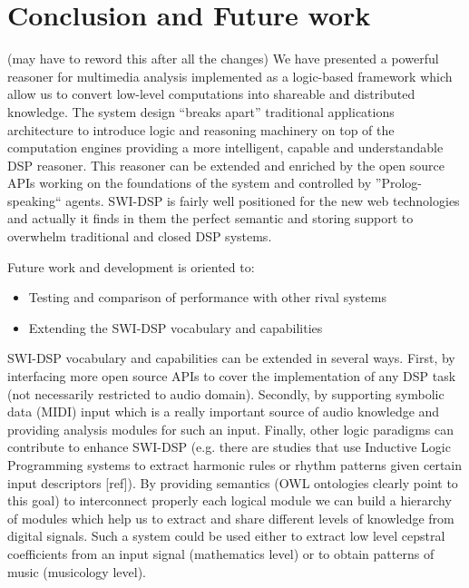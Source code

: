 \documentclass[runningheads]{llncs}
\begin{document}

\section{Conclusion and Future work}\label{sec:conclusion}

(may have to reword this after all the changes)
We have presented a powerful reasoner for multimedia analysis implemented as a logic-based framework which allow us to convert low-level computations into shareable and distributed knowledge. The system design ``breaks apart'' traditional applications architecture to introduce logic and reasoning machinery on top of the computation engines providing a more intelligent, capable and understandable DSP reasoner. This reasoner can be extended and enriched by the open source APIs working on the foundations of the system and controlled by ''Prolog-speaking`` agents. SWI-DSP is fairly well positioned for the new web technologies and actually it finds in them the perfect semantic and storing support to overwhelm traditional and closed DSP systems.

Future work and development is oriented to:

\begin{itemize}
 \item Testing and comparison of performance with other rival systems
 \item Extending the SWI-DSP vocabulary and capabilities
\end{itemize}

SWI-DSP vocabulary and capabilities can be extended in several ways. First, by interfacing more open source APIs to cover the implementation of any DSP task (not necessarily restricted to audio domain). Secondly, by supporting symbolic data (MIDI) input which is a really important source of audio knowledge and providing analysis modules for such an input. Finally, other logic paradigms can contribute to enhance SWI-DSP (e.g. there are studies that use Inductive Logic Programming systems to extract harmonic rules or rhythm patterns given certain input descriptors [ref]). By providing semantics (OWL ontologies clearly point to this goal) to interconnect properly each logical module we can build a hierarchy of modules which help us to extract and share different levels of knowledge from digital signals. Such a system could be used either to extract low level cepstral coefficients from an input signal (mathematics level) or to obtain patterns of music (musicology level).
\end{document}
